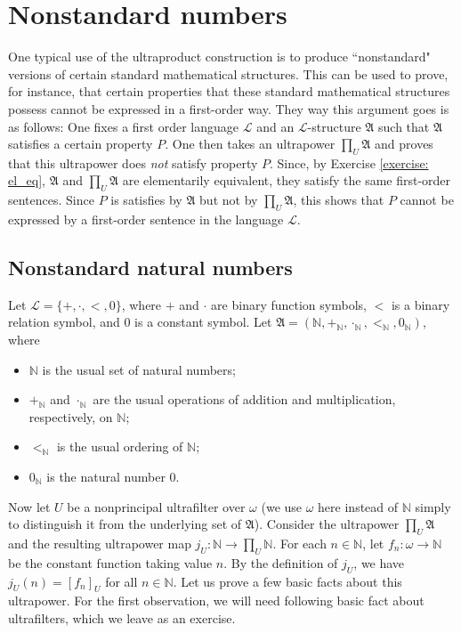 \documentclass[a4paper]{memoir}
\theoremstyle{definition}
\newcommand{\bb}{\mathbb}
\newcommand{\mc}{\mathcal}
\newcommand{\ra}{\rightarrow}
\begin{document}
\section{Nonstandard numbers}

One typical use of the ultraproduct construction is to produce ``nonstandard" versions of 
certain standard mathematical structures. This can be used to prove, for instance, that certain 
properties that these standard mathematical structures possess cannot be expressed in a 
first-order way. They way this argument goes is as follows: One fixes a first order language 
$\mc{L}$ and an $\mc{L}$-structure $\mathfrak{A}$ such that $\mathfrak{A}$ satisfies a certain property 
$P$. One then takes an ultrapower $\prod_U \mathfrak{A}$ and proves that this ultrapower 
does \emph{not} satisfy property $P$. Since, by Exercise \ref{exercise: el_eq}, 
$\mathfrak{A}$ and $\prod_U \mathfrak{A}$ are elementarily equivalent, they satisfy the same 
first-order sentences. Since $P$ is satisfies by $\mathfrak{A}$ but not by 
$\prod_U \mathfrak{A}$, this shows that $P$ cannot be expressed by a first-order sentence in 
the language $\mc{L}$.

\subsection{Nonstandard natural numbers}

Let $\mc{L} = \{+, \cdot, <, 0\}$, where $+$ and $\cdot$ are binary function symbols, $<$ is a binary 
relation symbol, and $0$ is a constant symbol. Let $\mathfrak{A} = (\bb{N}, +_{\bb{N}}, \cdot_{\bb{N}}, 
<_{\bb{N}}, 0_{\bb{N}})$, where
\begin{itemize}
  \item $\bb{N}$ is the usual set of natural numbers;
  \item $+_{\bb{N}}$ and $\cdot_{\bb{N}}$ are the usual operations of addition and multiplication, 
  respectively, on $\bb{N}$;
  \item $<_{\bb{N}}$ is the usual ordering of $\bb{N}$;
  \item $0_{\bb{N}}$ is the natural number $0$.
\end{itemize}

Now let $U$ be a nonprincipal ultrafilter over $\omega$ (we use $\omega$ here instead of $\bb{N}$ 
simply to distinguish it from the underlying set of $\mathfrak{A}$). Consider the ultrapower 
$\prod_U \mathfrak{A}$ and the resulting ultrapower map $j_U : \bb{N} \ra \prod_U \bb{N}$.
For each $n \in \bb{N}$, let $f_n:\omega \ra \bb{N}$ be the constant function taking value 
$n$. By the definition of $j_U$, we have $j_U(n) = [f_n]_U$ for all $n \in \bb{N}$.
Let us prove a few basic facts about this ultrapower. For the first observation, we will need 
following basic fact about ultrafilters, which we leave as an exercise.
\end{document}
